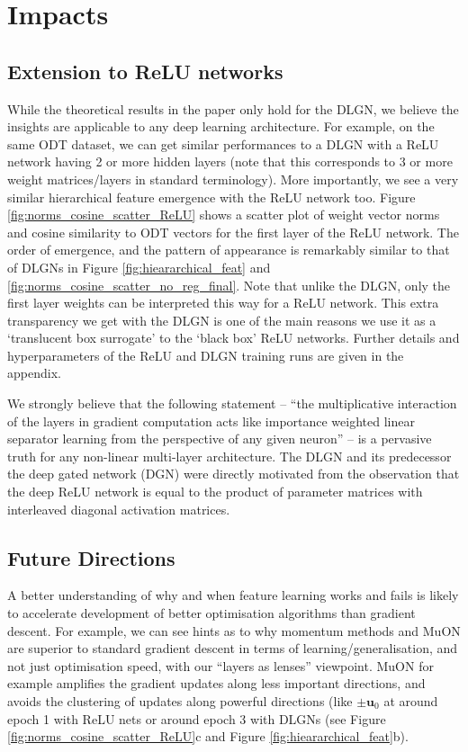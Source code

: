 \documentclass{article}
\theoremstyle{plain}
\theoremstyle{definition}
\theoremstyle{remark}
\newcommand{\1}{{\mathbf 1}}
\newcommand{\0}{{\mathbf 0}}
\newcommand{\bu}{{\mathbf u}}
\renewcommand{\>}{{\rightarrow}}
\begin{document}
\section{Impacts}

\subsection{Extension to ReLU networks}

While the theoretical results in the paper only hold for the DLGN, we believe the insights are applicable to any deep learning architecture. For example, on the same ODT dataset, we can get similar performances to a DLGN with a ReLU network having 2 or more hidden layers (note that this corresponds to 3 or more weight matrices/layers in standard terminology). More importantly, we see a very similar hierarchical feature emergence with the ReLU network too. Figure \ref{fig:norms_cosine_scatter_ReLU} shows a scatter plot of weight vector norms and cosine similarity to ODT vectors for the first layer of the ReLU network. The order of emergence, and the pattern of appearance is remarkably similar to that of DLGNs in Figure \ref{fig:hieararchical_feat} and \ref{fig:norms_cosine_scatter_no_reg_final}. Note that unlike the DLGN, only the first layer weights can be interpreted this way for a ReLU network. This extra transparency we get with the DLGN is one of the main reasons we use it as a `translucent box surrogate' to the `black box' ReLU networks. Further details and hyperparameters of the ReLU and DLGN training runs are given in the appendix. 

We strongly believe that the following statement -- ``the multiplicative interaction of the layers in gradient computation acts like importance weighted linear separator learning from the perspective of any given neuron'' -- is a pervasive truth for any non-linear multi-layer architecture. The DLGN \cite{Banerjee+25} and its predecessor the deep gated network (DGN) \cite{LakshmiSingh20} were directly motivated from the observation that the deep ReLU network is equal to the product of parameter matrices with interleaved diagonal activation matrices.

\subsection{Future Directions}
A better understanding of why and when feature learning works and fails is likely to accelerate development of better optimisation algorithms than gradient descent. For example, we can see hints as to why momentum methods and MuON \cite{jordan2025muon} are superior to standard gradient descent in terms of learning/generalisation, and not just optimisation speed, with our ``layers as lenses''  viewpoint. MuON for example amplifies the gradient updates along less important directions, and avoids the clustering of updates along powerful directions (like $\pm \bu_0$ at around epoch 1 with ReLU nets or around epoch 3 with DLGNs (see Figure \ref{fig:norms_cosine_scatter_ReLU}c and Figure \ref{fig:hieararchical_feat}b). 
\end{document}
